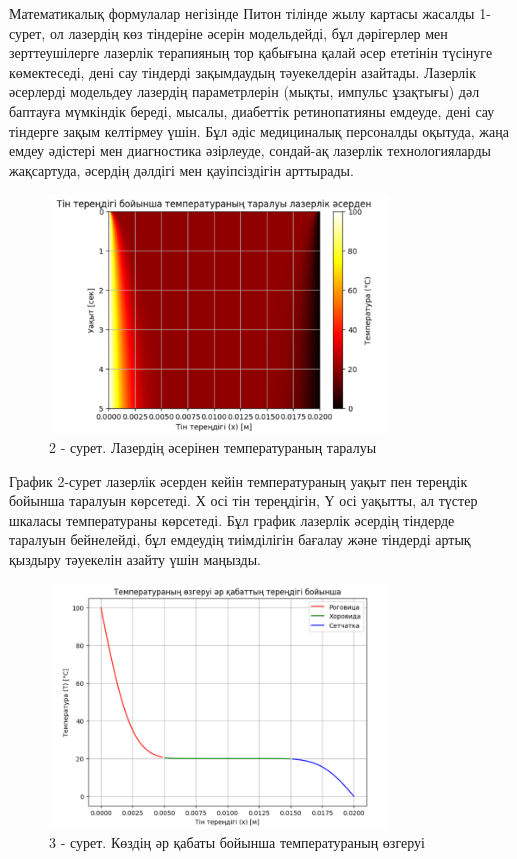 \begin{multicols}{2}
Математикалық формулалар негізінде Питон тілінде жылу картасы жасалды
1-сурет, ол лазердің көз тіндеріне әсерін модельдейді, бұл дәрігерлер
мен зерттеушілерге лазерлік терапияның тор қабығына қалай әсер ететінін
түсінуге көмектеседі, дені сау тіндерді зақымдаудың тәуекелдерін
азайтады. Лазерлік әсерлерді модельдеу лазердің параметрлерін (мықты,
импульс ұзақтығы) дәл баптауға мүмкіндік береді, мысалы, диабеттік
ретинопатияны емдеуде, дені сау тіндерге зақым келтірмеу үшін. Бұл әдіс
медициналық персоналды оқытуда, жаңа емдеу әдістері мен диагностика
әзірлеуде, сондай-ақ лазерлік технологияларды жақсартуда, әсердің
дәлдігі мен қауіпсіздігін арттырады.
\end{multicols}

\begin{figure}[H]
	\centering
	\includegraphics[width=0.8\textwidth]{media/ict/image21}
	\caption*{2 - сурет. Лазердің әсерінен температураның таралуы}
\end{figure}

\begin{multicols}{2}
График 2-сурет лазерлік әсерден кейін температураның уақыт пен тереңдік
бойынша таралуын көрсетеді. Х осі тін тереңдігін, Ү осі уақытты, ал
түстер шкаласы температураны көрсетеді. Бұл график лазерлік әсердің
тіндерде таралуын бейнелейді, бұл емдеудің тиімділігін бағалау және
тіндерді артық қыздыру тәуекелін азайту үшін маңызды.
\end{multicols}

\begin{figure}[H]
	\centering
	\includegraphics[width=0.8\textwidth]{media/ict/image22}
	\caption*{3 - сурет. Көздің әр қабаты бойынша температураның өзгеруі}
\end{figure}

